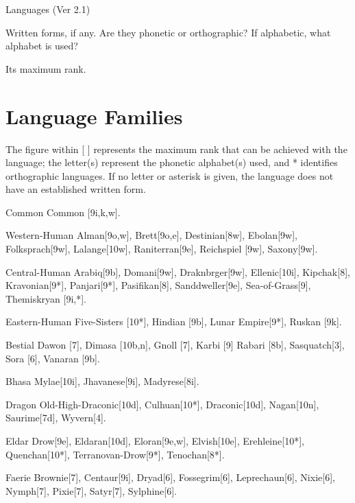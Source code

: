 \begin{Chapter}{Languages (Ver 2.1)}
\begin{Itemize}
\item Written forms, if any.  Are they phonetic or orthographic? If
  alphabetic, what alphabet is used?

\item Its maximum rank. 

\end{Itemize}

\section{Language Families}

The figure within [ ] represents the maximum rank that can be achieved
with the language; the letter(s) represent the phonetic alphabet(s)
used, and * identifies orthographic languages.  If no letter or
asterisk is given, the language does not have an established written
form.

\begin{Description}
  
\item[Common] Common [9i,k,w]. 

\item[Western-Human] Alman[9o,w], Brett[9o,e], Destinian[8w],
  Ebolan[9w], Folksprach[9w], Lalange[10w], Raniterran[9e], Reichspiel
  [9w], Saxony[9w].

\item[Central-Human] Arabiq[9b], Domani[9w], Draknbrger[9w],
  Ellenic[10i], Kipchak[8], Kravonian[9*], Panjari[9*], Pasifikan[8],
  Sanddweller[9e], Sea-of-Grass[9], Themiskryan [9i,*].

\item[Eastern-Human] Five-Sisters [10*], Hindian [9b], Lunar
  Empire[9*], Ruskan [9k].

\item[Bestial] Dawon [7], Dimasa [10b,n], Gnoll [7], Karbi [9] Rabari
  [8b], Sasquatch[3], Sora [6], Vanaran [9b].

\item[Bhasa] Mylae[10i], Jhavanese[9i], Madyrese[8i]. 

\item[Dragon] Old-High-Draconic[10d], Culhuan[10*], Draconic[10d],
  Nagan[10n], Saurime[7d], Wyvern[4].

\item[Eldar] Drow[9e], Eldaran[10d], Eloran[9e,w], Elvish[10e],
  Erehleine[10*], Quenchan[10*], Terranovan-Drow[9*], Tenochan[8*].

\item[Faerie] Brownie[7], Centaur[9i], Dryad[6], Fossegrim[6],
Leprechaun[6], Nixie[6], Nymph[7], Pixie[7], Satyr[7], Sylphine[6].


\end{Description}
\end{Chapter}

